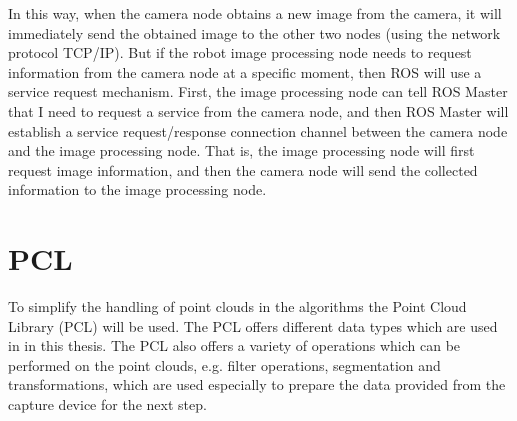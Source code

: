 In this way, when the camera node obtains a new image from the camera, it will immediately send the obtained image to the other two nodes (using the network protocol TCP/IP). But if the robot image processing node needs to request information from the camera node at a specific moment, then ROS will use a service request mechanism. First, the image processing node can tell ROS Master that I need to request a service from the camera node, and then ROS Master will establish a service request/response connection channel between the camera node and the image processing node. That is, the image processing node will first request image information, and then the camera node will send the collected information to the image processing node.\\

\section{PCL}
To simplify the handling of point clouds in the algorithms the Point Cloud Library (PCL) will be used. The PCL offers different data types which are used in in this thesis. The PCL also offers a variety of operations which can be performed on the point clouds, e.g. filter operations, segmentation and transformations, which are used especially to prepare the data provided from the capture device for the next step.
